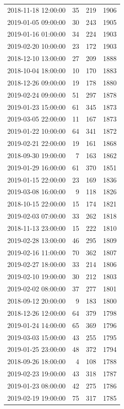 \begin{tabular}{lrrr}
2018-11-18 12:00:00 & 35 & 219 & 1906 \\
2019-01-05 09:00:00 & 30 & 243 & 1905 \\
2019-01-16 01:00:00 & 34 & 224 & 1903 \\
2019-02-20 10:00:00 & 23 & 172 & 1903 \\
2018-12-10 13:00:00 & 27 & 209 & 1888 \\
2018-10-04 18:00:00 & 10 & 170 & 1883 \\
2018-12-26 09:00:00 & 19 & 178 & 1880 \\
2019-02-24 09:00:00 & 51 & 297 & 1878 \\
2019-01-23 15:00:00 & 61 & 345 & 1873 \\
2019-03-05 22:00:00 & 11 & 167 & 1873 \\
2019-01-22 10:00:00 & 64 & 341 & 1872 \\
2019-02-21 22:00:00 & 19 & 161 & 1868 \\
2018-09-30 19:00:00 & 7 & 163 & 1862 \\
2019-01-29 16:00:00 & 61 & 370 & 1851 \\
2019-01-15 22:00:00 & 23 & 169 & 1836 \\
2019-03-08 16:00:00 & 9 & 118 & 1826 \\
2018-10-15 22:00:00 & 15 & 174 & 1821 \\
2019-02-03 07:00:00 & 33 & 262 & 1818 \\
2018-11-13 23:00:00 & 15 & 222 & 1810 \\
2019-02-28 13:00:00 & 46 & 295 & 1809 \\
2019-02-16 11:00:00 & 70 & 362 & 1807 \\
2019-02-27 18:00:00 & 33 & 214 & 1806 \\
2019-02-10 19:00:00 & 30 & 212 & 1803 \\
2019-02-02 08:00:00 & 37 & 277 & 1801 \\
2018-09-12 20:00:00 & 9 & 183 & 1800 \\
2018-12-26 12:00:00 & 64 & 379 & 1798 \\
2019-01-24 14:00:00 & 65 & 369 & 1796 \\
2019-03-03 15:00:00 & 43 & 255 & 1795 \\
2019-01-25 23:00:00 & 48 & 372 & 1794 \\
2018-09-26 18:00:00 & 4 & 108 & 1788 \\
2019-02-23 19:00:00 & 43 & 318 & 1787 \\
2019-01-23 08:00:00 & 42 & 275 & 1786 \\
2019-02-19 19:00:00 & 75 & 317 & 1785 \\

\end{tabular}
